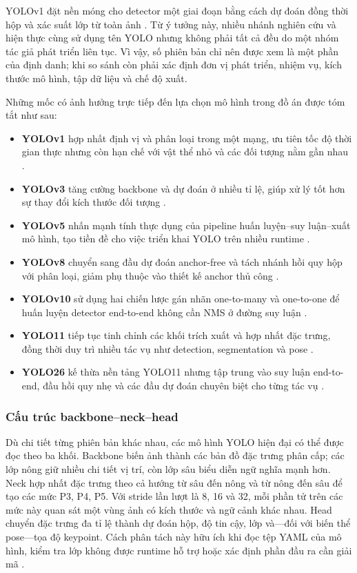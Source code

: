 YOLOv1 đặt nền móng cho detector một giai đoạn bằng cách dự đoán đồng thời hộp và xác suất lớp từ toàn ảnh . Từ ý tưởng này, nhiều nhánh nghiên cứu và hiện thực cùng sử dụng tên YOLO nhưng không phải tất cả đều do một nhóm tác giả phát triển liên tục. Vì vậy, số phiên bản chỉ nên được xem là một phần của định danh; khi so sánh còn phải xác định đơn vị phát triển, nhiệm vụ, kích thước mô hình, tập dữ liệu và chế độ xuất.

Những mốc có ảnh hưởng trực tiếp đến lựa chọn mô hình trong đồ án được tóm tắt như sau:

\begin{itemize}
    \item \textbf{YOLOv1} hợp nhất định vị và phân loại trong một mạng, ưu tiên tốc độ thời gian thực nhưng còn hạn chế với vật thể nhỏ và các đối tượng nằm gần nhau .
    \item \textbf{YOLOv3} tăng cường backbone và dự đoán ở nhiều tỉ lệ, giúp xử lý tốt hơn sự thay đổi kích thước đối tượng .
    \item \textbf{YOLOv5} nhấn mạnh tính thực dụng của pipeline huấn luyện--suy luận--xuất mô hình, tạo tiền đề cho việc triển khai YOLO trên nhiều runtime .
    \item \textbf{YOLOv8} chuyển sang đầu dự đoán anchor-free và tách nhánh hồi quy hộp với phân loại, giảm phụ thuộc vào thiết kế anchor thủ công .
    \item \textbf{YOLOv10} sử dụng hai chiến lược gán nhãn one-to-many và one-to-one để huấn luyện detector end-to-end không cần NMS ở đường suy luận .
    \item \textbf{YOLO11} tiếp tục tinh chỉnh các khối trích xuất và hợp nhất đặc trưng, đồng thời duy trì nhiều tác vụ như detection, segmentation và pose .
    \item \textbf{YOLO26} kế thừa nền tảng YOLO11 nhưng tập trung vào suy luận end-to-end, đầu hồi quy nhẹ và các đầu dự đoán chuyên biệt cho từng tác vụ .
\end{itemize}

\subsubsection{Cấu trúc backbone--neck--head}

Dù chi tiết từng phiên bản khác nhau, các mô hình YOLO hiện đại có thể được đọc theo ba khối. Backbone biến ảnh thành các bản đồ đặc trưng phân cấp; các lớp nông giữ nhiều chi tiết vị trí, còn lớp sâu biểu diễn ngữ nghĩa mạnh hơn. Neck hợp nhất đặc trưng theo cả hướng từ sâu đến nông và từ nông đến sâu để tạo các mức P3, P4, P5. Với stride lần lượt là 8, 16 và 32, mỗi phần tử trên các mức này quan sát một vùng ảnh có kích thước và ngữ cảnh khác nhau. Head chuyển đặc trưng đa tỉ lệ thành dự đoán hộp, độ tin cậy, lớp và---đối với biến thể pose---tọa độ keypoint. Cách phân tách này hữu ích khi đọc tệp YAML của mô hình, kiểm tra lớp không được runtime hỗ trợ hoặc xác định phần đầu ra cần giải mã .

